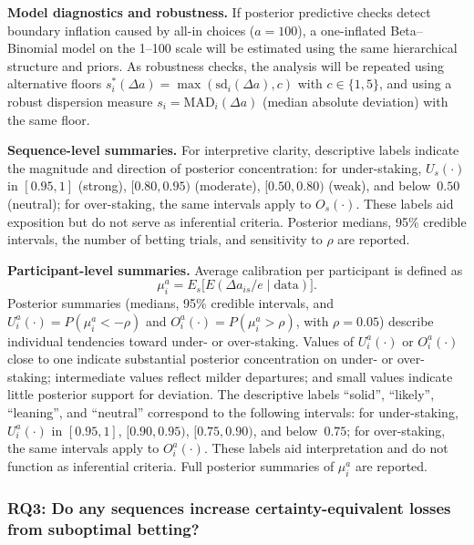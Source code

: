 \documentclass[11pt,a4paper]{article}
\numberwithin{equation}{section}
\begin{document}
\textbf{Model diagnostics and robustness.}
If posterior predictive checks detect boundary inflation caused by all-in choices ($a=100$), 
a one-inflated Beta--Binomial model on the 1--100 scale will be estimated using the same hierarchical structure and priors.
As robustness checks, the analysis will be repeated using alternative floors
$s_i^{\ast}(\Delta a)=\max(\mathrm{sd}_i(\Delta a),c)$ with $c\in\{1,5\}$, and
using a robust dispersion measure $s_i=\mathrm{MAD}_i(\Delta a)$ (median absolute deviation) with the same floor.

\textbf{Sequence-level summaries.}
For interpretive clarity, descriptive labels indicate the magnitude and direction of posterior concentration:  
for under-staking, $U_s(\cdot)$ in $[0.95,1]$ (strong), $[0.80,0.95)$ (moderate), $[0.50,0.80)$ (weak), and below~$0.50$ (neutral);  
for over-staking, the same intervals apply to $O_s(\cdot)$.  
These labels aid exposition but do not serve as inferential criteria.  
Posterior medians, 95\% credible intervals, the number of betting trials, and sensitivity to $\rho$ are reported.

\textbf{Participant-level summaries.}
Average calibration per participant is defined as
\[
\mu_i^{a} = E_s\!\big[E(\Delta a_{is}/e \mid \text{data})\big].
\]
Posterior summaries (medians, 95\% credible intervals, and 
$U^{a}_i(\cdot)=P(\mu_i^{a} < -\rho)$ and $O^{a}_i(\cdot)=P(\mu_i^{a} > \rho)$, with $\rho = 0.05$) describe individual tendencies toward under- or over-staking.  
Values of $U^{a}_i(\cdot)$ or $O^{a}_i(\cdot)$ close to one indicate substantial posterior concentration on under- or over-staking; intermediate values reflect milder departures; and small values indicate little posterior support for deviation.  
The descriptive labels \enquote{solid}, \enquote{likely}, \enquote{leaning}, and \enquote{neutral} correspond to the following intervals: 
for under-staking, $U^{a}_i(\cdot)$ in $[0.95,1]$, $[0.90,0.95)$, $[0.75,0.90)$, and below~$0.75$; 
for over-staking, the same intervals apply to $O^{a}_i(\cdot)$.  
These labels aid interpretation and do not function as inferential criteria.  
Full posterior summaries of $\mu_i^{a}$ are reported.



\subsubsection{RQ3: Do any sequences increase certainty-equivalent losses from suboptimal betting?}
\label{Sec:Rq3}
\end{document}
